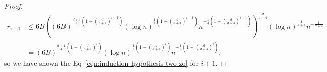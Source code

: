 \begin{proof}
 \begin{align*}
r_{i+1}  &\leq 6B \left((6B)^{\frac{d+4}{4}\left(1-\left(\frac{d}{d+4}\right)^{i-1}\right)}
		\left(\log n\right)^{\frac{1}{4}\left(1-\left(\frac{d}{d+4}\right)^{i-1}\right)}
		n^{-\frac{1}{4}\left(1-\left(\frac{d}{d+4}\right)^{i-1}\right)}\right)
			^\frac{d}{d+4} (\log n)^\frac{1}{d+4} n^{-\frac{1}{d+4}}  \\
	&= (6B)^{\frac{d+4}{4}\left(1-\left(\frac{d}{d+4}\right)^{i}\right)}
		\left(\log n\right)^{\frac{1}{4}\left(1-\left(\frac{d}{d+4}\right)^{i}\right)}
		n^{-\frac{1}{4}\left(1-\left(\frac{d}{d+4}\right)^{i}\right)},
 \end{align*}
so we have shown the Eq~\eqref{eqn:induction-hypothesis-two-zo} for $i+1$. 
%

\end{proof}
